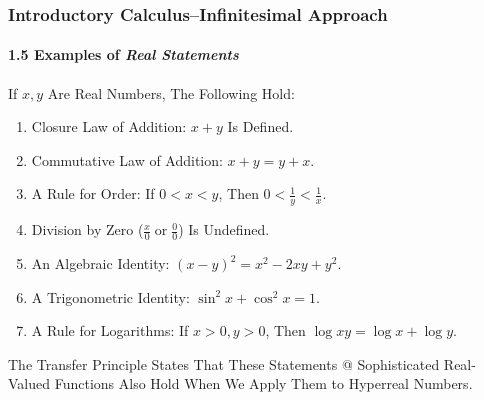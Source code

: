 \begin{frame}
\frametitle{Introductory Calculus--Infinitesimal Approach}
\framesubtitle{1.5 Examples of \alert{\textit{Real Statements}}}
\label{slide:1.5-10}
\begin{example}
\label{ex:real-statements}
If $x,y$ Are Real Numbers, The Following Hold:
\begin{enumerate}
\item Closure Law of Addition: $x+y$ Is Defined.
\item Commutative Law of Addition: $x+y=y+x$.
\item A Rule for Order: If $0<x<y$, Then $0<\frac{1}{y}<\frac{1}{x}$.
\item Division by Zero ($\frac{x}{0}\;\text{or}\;\frac{0}{0}$) Is Undefined.
\item An Algebraic Identity: $(x-y)^2=x^2-2xy+y^2$. 
\item A Trigonometric Identity: $\sin^2x+\cos^2x=1$.
\item A Rule for Logarithms: If $x>0,y>0$, Then $\log xy=\log x + \log y$.
\end{enumerate}
\end{example}
The Transfer Principle States That These \alert{Statements @ Sophisticated Real-Valued Functions Also Hold When We Apply Them to Hyperreal Numbers}.
\end{frame}
